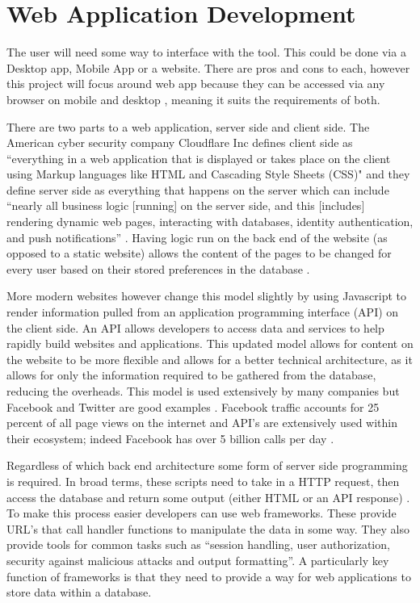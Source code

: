 \documentclass{UoYCSproject}
\begin{document}
\section{Web Application Development}
\label{sec:web_app_dev}
The user will need some way to interface with the tool. This could be done via a Desktop app, Mobile App or a website. There are pros and cons to each, however this project will focus around web app because they can be accessed via any browser on mobile and desktop \cite{tuama_2022}, meaning it suits the requirements of both.

There are two parts to a web application, server side and client side. The American cyber security company Cloudflare Inc defines client side as “everything in a web application that is displayed or takes place on the client using Markup languages like HTML and Cascading Style Sheets (CSS)" and they define server side as everything that happens on the server which can include “nearly all business logic [running] on the server side, and this [includes] rendering dynamic web pages, interacting with databases, identity authentication, and push notifications” \cite{cloudflare_client_vs_server_side}. Having logic run on the back end of the website (as opposed to a static website) allows the content of the pages to be changed for every user based on their stored preferences in the database \cite{muittari_2020}.

More modern websites however change this model slightly by using Javascript to render information pulled from an application programming interface (API) on the client side. An API allows developers to access data and services to help rapidly build websites and applications. This updated model allows for content on the website to be more flexible and allows for a better technical architecture, as it allows for only the information required to be gathered from the database, reducing the overheads. This model is used extensively by many companies but Facebook and Twitter are good examples \cite{jacobson_brail_woods_2012}. Facebook traffic accounts for 25 percent of all page views on the internet and API’s are extensively used within their ecosystem; indeed Facebook has over 5 billion calls per day \cite{jacobson_brail_woods_2012}.

Regardless of which back end architecture some form of server side programming is required. In broad terms, these scripts need to take in a HTTP request, then access the database and return some output (either HTML or an API response) \cite{muittari_2020}. To make this process easier developers can use web frameworks. These provide URL’s that call handler functions to manipulate the data in some way. They also provide tools for common tasks such as “session handling, user authorization, security against malicious attacks and output formatting”\cite{muittari_2020}. A particularly key function of frameworks is that they need to provide a way for web applications to store data within a database. 
\end{document}
